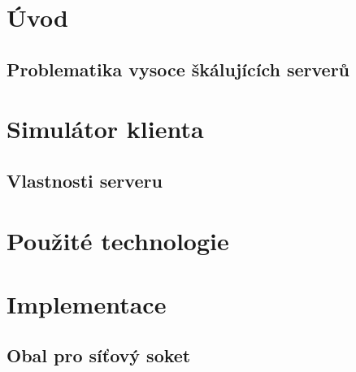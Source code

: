 \documentclass[11pt,oneside, final]{fithesis2}
\begin{document}
  
\FrontMatter  
\ThesisTitlePage  
 
\begin{ThesisDeclaration}  
\DeclarationText  
\AdvisorName  
\end{ThesisDeclaration}  
 
\begin{ThesisThanks}  

\end{ThesisThanks}  
 
\begin{ThesisAbstract}  

\end{ThesisAbstract}  
 
\begin{ThesisKeyWords}  

\end{ThesisKeyWords}  
 
\MainMatter
 
\tableofcontents          %
 
\chapter{Úvod}
\section{Problematika vysoce škálujících serverů}


\chapter{Simulátor klienta}
\section{Vlastnosti serveru}


\chapter{Použité technologie}


\chapter{Implementace}


\section{Obal pro síťový soket}
\end{document}
